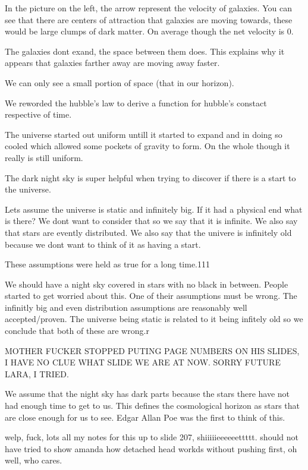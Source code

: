 \documentclass{article}
\begin{document}

In the picture on the left, the arrow represent the velocity of galaxies. You can see that there are centers of attraction that galaxies are moving towards, these would be large clumps of dark matter. On average though the net velocity is 0.


The galaxies dont exand, the space between them does. This explains why it appears that galaxies farther away are moving away faster.


We can only see a small portion of space (that in our horizon).


We reworded the hubble's law to derive a function for hubble's constact respective of time.


The universe started out uniform untill it started to expand and in doing so cooled which allowed some pockets of gravity to form. On the whole though it really is still uniform.



The dark night sky is super helpful when trying to discover if there is a start to the universe.

Lets assume the universe is static and infinitely big. If it had a physical end what is there? We dont want to consider that so we say that it is infinite. We also say that stars are evently distributed. We also say that the univere is infinitely old because we dont want to think of it as having a start.

These assumptions were held as true for a long time.111

We should have a night sky covered in stars with no black in between. People started to get worried about this. One of their assumptions must be wrong. The infinitly big and even distribution assumptions are reasonably well accepted/proven. The universe being static is related to it being infitely old so we conclude that both of these are wrong.r

MOTHER FUCKER STOPPED PUTING PAGE NUMBERS ON HIS SLIDES, I HAVE NO CLUE WHAT SLIDE WE ARE AT NOW. SORRY FUTURE LARA, I TRIED.

We assume that the night sky has dark parts because the stars there have not had enough time to get to us. This defines the cosmological horizon as stars that are close enough for us to see. Edgar Allan Poe was the first to think of this.

welp, fuck, lots all my notes for this up to slide 207, shiiiiieeeeeettttt. should not have tried to show amanda how detached head workds without pushing first, oh well, who cares.
\end{document}

